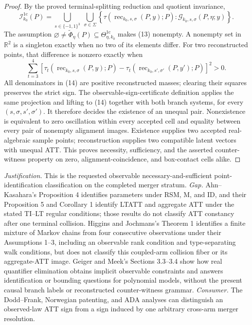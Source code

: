 \documentclass{article}
\begin{document}
\begin{proof}
By the proved terminal-splitting reduction and quotient invariance,
\[
 \mathcal I_{k_0}^{1\mathrm c}(P)
 =\bigcup_{s\in\{-1,1\}^3}\ \bigcup_{\sigma\in\Sigma}
 \left\{\tau(\operatorname{rec}_{k_0,s,\sigma}(P,y);P):
 \mathscr G_{k_0,s,\sigma}(P,\eta;y)\right\}.
 \tag{13}
\]
The assumption \(\varnothing\ne\widetilde\Phi_\eta(P)\subseteq\Theta_{\eta,k_0}^{1\mathrm c}\) makes (13) nonempty.  A nonempty set in \(\mathbb R^2\) is a singleton exactly when no two of its elements differ.  For two reconstructed points, that difference is nonzero exactly when
\[
 \sum_{t=3}^4
 \left[\tau_t(\operatorname{rec}_{k_0,s,\sigma}(P,y);P)
 -\tau_t(\operatorname{rec}_{k_0,s',\sigma'}(P,y');P)\right]^2>0.
 \tag{14}
\]
All denominators in (14) are positive reconstructed masses; clearing their squares preserves the strict sign.  The observable-sign-certificate definition applies the same projection and lifting to (14) together with both branch systems, for every \((s,\sigma,s',\sigma')\).  It therefore decides the existence of an unequal pair.  Nonexistence is equivalent to zero oscillation within every accepted cell and equality between every pair of nonempty alignment images.  Existence supplies two accepted real-algebraic sample points; reconstruction supplies two compatible latent vectors with unequal ATT.  This proves necessity, sufficiency, and the asserted counter-witness property on zero, alignment-coincidence, and box-contact cells alike.
\end{proof}
\par\smallskip\noindent \textit{Justification.} This is the requested observable necessary-and-sufficient point-identification classification on the completed merger stratum. \textit{Gap.} Ahn--Kasahara's Proposition 4 identifies parameters under RSM, M, and ID, and their Proposition 5 and Corollary 1 identify LTATT and aggregate ATT under the stated TI--LT regular conditions; those results do not classify ATT constancy after one terminal collision. Higgins and Jochmans's Theorem 1 identifies a finite mixture of Markov chains from four consecutive observations under their Assumptions 1--3, including an observable rank condition and type-separating walk conditions, but does not classify this coupled-arm collision fiber or its aggregate-ATT image. Geiger and Meek's Sections 3.3--3.4 show how real quantifier elimination obtains implicit observable constraints and answers identification or bounding questions for polynomial models, without the present causal branch labels or reconstructed counter-witness grammar. \textit{Consumer.} The Dodd--Frank, Norwegian patenting, and ADA analyses can distinguish an observed-law ATT sign from a sign induced by one arbitrary cross-arm merger resolution.
\end{document}
